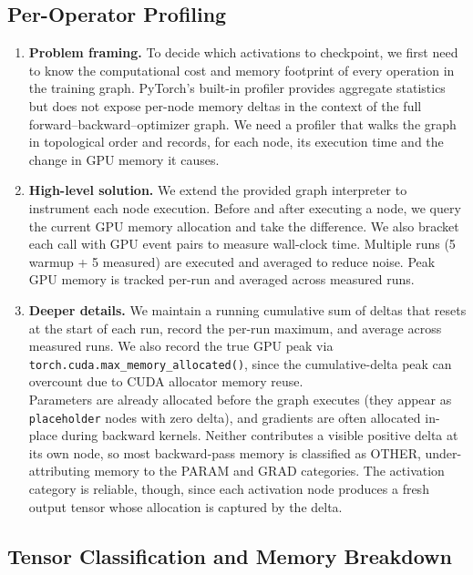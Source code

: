 \documentclass[11pt]{article}
\begin{document}
\subsection{Per-Operator Profiling}

\begin{enumerate}[label=\alph*),nosep,leftmargin=*]
\item \textbf{Problem framing.}
To decide which activations to checkpoint, we first need to know the computational cost and memory footprint of every operation in the training graph. PyTorch's built-in profiler provides aggregate statistics but does not expose per-node memory deltas in the context of the full forward--backward--optimizer graph. We need a profiler that walks the graph in topological order and records, for each node, its execution time and the change in GPU memory it causes.

\item \textbf{High-level solution.}
We extend the provided graph interpreter to instrument each node execution. Before and after executing a node, we query the current GPU memory allocation and take the difference. We also bracket each call with GPU event pairs to measure wall-clock time. Multiple runs (5 warmup + 5 measured) are executed and averaged to reduce noise. Peak GPU memory is tracked per-run and averaged across measured runs.

\item \textbf{Deeper details.}
We maintain a running cumulative sum of deltas that resets at the start of each run, record the per-run maximum, and average across measured runs. We also record the true GPU peak via \lstinline|torch.cuda.max_memory_allocated()|, since the cumulative-delta peak can overcount due to CUDA allocator memory reuse.\\

Parameters are already allocated before the graph executes (they appear as \texttt{placeholder} nodes with zero delta), and gradients are often allocated in-place during backward kernels. Neither contributes a visible positive delta at its own node, so most backward-pass memory is classified as OTHER, under-attributing memory to the PARAM and GRAD categories. The activation category is reliable, though, since each activation node produces a fresh output tensor whose allocation is captured by the delta.
\end{enumerate}

\subsection{Tensor Classification and Memory Breakdown}
\end{document}
